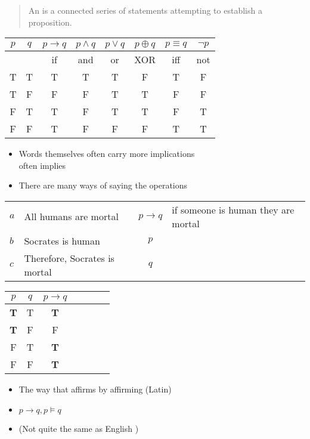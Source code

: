 \documentclass[headrule,footrule]{foils}
\begin{document}
\begin{quote}
  An  is a connected series of statements attempting to
  establish a proposition.
\end{quote}

\begin{center}
  \begin{tabular}{|c|c|c|c|c|c|c|c|}
    \hline
    $p$ & $q$ & $p \rightarrow q$ & $p \wedge q$ & $p \vee q$ 
    & $p \oplus q$ & $p \equiv q$ & $\neg p$\\
    \hline
    &   & if & and & or &  XOR & iff & not  \\
    \hline
    T & T & T & T & T & F & T & F \\ 
    T & F & F & F & T & T & F & F \\  
    F & T & T & F & T & T & F & T\\ 
    F & F & T & F & F & F & T & T\\ \hline
  \end{tabular}
  \begin{itemize}
  \item Words themselves often carry more implications
    \\  often implies 
  \item There are many ways of saying the operations
  \end{itemize}
\end{center}



\begin{center}
  \begin{tabular}{llcl}
    $a$ & All humans are mortal & $p  \rightarrow q$ & 
    \small if someone is human they are mortal\\
    $b$ & Socrates is human & $p$ \\ \hline
    $c$ & Therefore, Socrates is mortal & $q$
  \end{tabular}


  \begin{tabular}{|c|c|c|c|c|c|c|}
    \hline
    $p$ & $q$ & $p \rightarrow q$  \\
    \hline
    \rowcolor{Gray}
    \textbf{T} & T & \textbf{T}  \\ 
    \textbf{T} & F & F  \\ 
    F & T & \textbf{T}  \\ 
    F & F & \textbf{T}  \\ 
    \hline
  \end{tabular}
\end{center}
\begin{itemize}
\item  The way that affirms by affirming (Latin)
\item $p \rightarrow q, p \models q$
\item {}  (Not quite the same as English )
\end{itemize}
\end{document}
